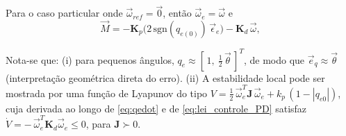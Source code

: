 Para o caso particular onde $\vec{\omega}_{ref}=\vec{0}$, então $\vec{\omega}_e=\vec{\omega}$ e
\begin{equation}
\vec{M} =
-\mathbf{K}_p \big(2\,\mathrm{sgn}(q_{e(0)})\,\vec{\epsilon}_e\big)
-\mathbf{K}_d\,\vec{\omega},
\label{eq:pd_equilibrio2}
\end{equation}


Nota-se que: (i) para pequenos ângulos,
$q_e \approx [\,1,\ \tfrac{1}{2}\,\vec{\theta}\,]^T$,
de modo que $\vec{e}_q \approx \vec{\theta}$ (interpretação geométrica direta do erro). 
(ii) A estabilidade local pode ser mostrada por uma função de Lyapunov do tipo $V=\tfrac{1}{2}\,\vec{\omega}_e^T\mathbf{J}\,\vec{\omega}_e + k_p\,(1-|q_{e0}|)$, cuja derivada ao longo de \eqref{eq:qedot} e de \eqref{eq:lei_controle_PD} satisfaz $\dot V = -\,\vec{\omega}_e^T \mathbf{K}_d \vec{\omega}_e \le 0$, para $\mathbf{J}\succ 0$.